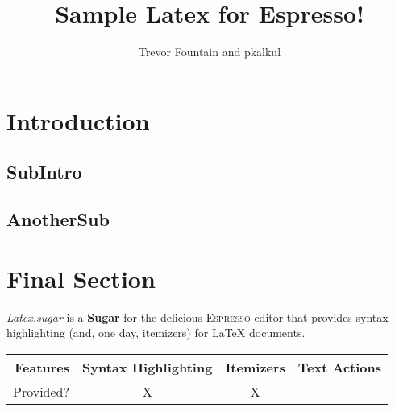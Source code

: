 \documentclass[10pt,twocolumn]{article}
\title{Sample Latex for Espresso!}
\author{Trevor Fountain and pkalkul}
\begin{document}
\maketitle

\section{Introduction}

\subsection{SubIntro}

\subsection{AnotherSub}

\section{Final Section}


\emph{Latex.sugar} is a \textbf{Sugar} for the delicious \textsc{Espresso} editor that provides syntax highlighting (and, one day, itemizers) for LaTeX documents.

\begin{table}[h!]
\begin{centering}
\begin{tabular}{r|c c c}
\textbf{Features} & Syntax Highlighting & Itemizers & Text Actions \\ \hline
Provided? & X & X &
\end{tabular}
\end{centering}
\end{table}
\end{document}
